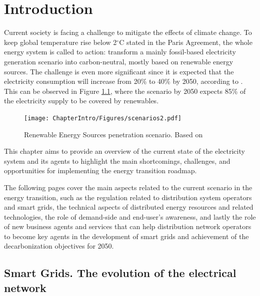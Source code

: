 \renewcommand\labelenumi{(\roman{enumi})}
\renewcommand\theenumi\labelenumi

\chapter{Introduction}
\label{chapterIntro}

Current society is facing a challenge to mitigate the effects of climate change. To keep global temperature rise below 2$^{\circ}$C stated in the Paris Agreement, the whole energy system is called to action: transform a mainly fossil-based electricity generation scenario into carbon-neutral, mostly based on renewable energy sources. The challenge is even more significant since it is expected that the electricity consumption will increase from 20\% to 40\% by 2050, according to \cite{IRENA2018}. This can be observed in Figure \ref{fig:scenarios}, where the scenario by 2050 expects 85\% of the electricity supply to be covered by renewables. 

\vspace*{3mm}
\begin{figure}[htbp]
	\centering 
	\texttt{[image: ChapterIntro/Figures/scenarios2.pdf]}
		\caption{Renewable Energy Sources penetration scenario. Based on \cite{IRENA2018}}  
		\label{fig:scenarios}
\end{figure}
\newpage
This chapter aims to provide an overview of the current state of the electricity system and its agents to highlight the main shortcomings, challenges, and opportunities for implementing the energy transition roadmap. 

The following pages cover the main aspects related to the current scenario in the energy transition, such as the regulation related to distribution system operators and smart grids, the technical aspects of distributed energy resources and related technologies, the role of demand-side and end-user's awareness, and lastly the role of new business agents and services that can help distribution network operators to become key agents in the development of smart grids and achievement of the decarbonization objectives for 2050. 


\section{Smart Grids. The evolution of the electrical network}

